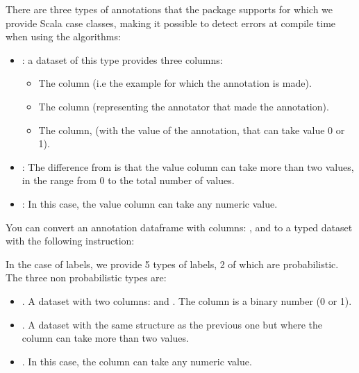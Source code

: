 \documentclass[letterpaper,10pt,english]{sphinxmanual}
\begin{document}
There are three types of annotations that the package supports for which we provide Scala case classes,
making it possible to detect errors at compile time when using the algorithms:
\begin{itemize}
\item {} 
: a dataset of this type provides three columns: 
\begin{itemize}
    \item The  column (i.e the example for which the annotation is made). 
    \item The  column (representing the annotator that made the annotation).
    \item The  column, (with the value of the annotation, that can take value 0 or 1).
\end{itemize}

\item {} 
: The difference from  is that the value column can
take more than two values, in the range from 0 to the total number of values.

\item {} 
: In this case, the value column can take any numeric value.

\end{itemize}

You can convert an annotation dataframe with columns: ,  
and  to a typed dataset with the following instruction:

%
\begin{sphinxVerbatim}[commandchars=\\\{\}]
   \PYG{o}{[}\PYG{o}{]}
\end{sphinxVerbatim}

In the case of labels, we provide 5 types of labels, 2 of which are probabilistic. The three non probabilistic
types are:
\begin{itemize}
\item {} 
  . A dataset with two columns:  and . The column  is a binary number (0 or 1).

\item {} 
  . A dataset with the same structure as the previous one but where the column  can take more than two values.

\item {} 
  . In this case, the column  can take any numeric value.

\end{itemize}
\end{document}

